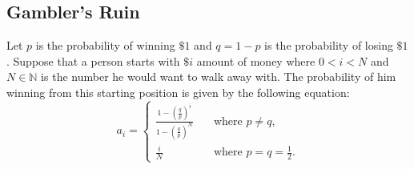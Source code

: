 \documentclass[10pt]{article}
\theoremstyle{remark}
\theoremstyle{plain}
\newcommand{\N}{\mathbb{N}}
\numberwithin{equation}{section}
\begin{document}
\subsection{Gambler's Ruin}
Let $p$ is the probability of winning $\$1$ and $q = 1 - p$ is the probability of losing $\$1$. Suppose that a person starts with $\$i$ amount of money where $0 < i < N$ and $N \in \N$ is the number he would want to walk away with. The probability of him winning from this starting position is given by the following equation:
	\[ a_i =
		\begin{cases}
			\frac{1-\left(\frac{q}{p}\right)^i}{1 - \left(\frac{q}{p}\right)^N} \quad & \text{where } p \neq q,\\
			\frac{i}{N}  &  \text{where } p = q = \frac{1}{2}.
		\end{cases}
	\]
	
\end{document}
